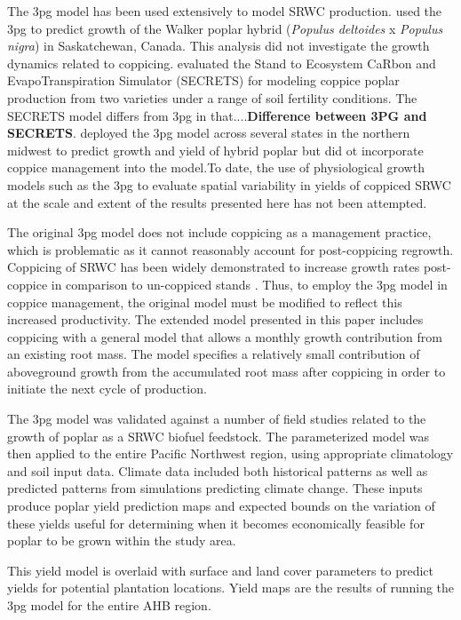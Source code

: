\documentclass[preprint,12pt]{elsarticle}
\begin{document}
The \ac{3pg} model has been used extensively to model \ac{SRWC}
production. \citet{Amichev2010} used the \ac{3pg} to predict growth of
the Walker poplar hybrid (\textit{Populus deltoides} x \textit{Populus
  nigra}) in Saskatchewan, Canada. This analysis did not investigate
the growth dynamics related to coppicing. \citet{Deckmyn2004}
evaluated the Stand to Ecosystem CaRbon and EvapoTranspiration
Simulator (SECRETS) for modeling coppice poplar production from two
varieties under a range of soil fertility conditions. The SECRETS
model differs from \ac{3pg} in that....\textbf{Difference between 3PG
  and SECRETS}. \citet{Headlee2012} deployed the \ac{3pg} model across
several states in the northern midwest to predict growth and yield of
hybrid poplar but did ot incorporate coppice management into the model.To date, the use of
physiological growth models such as the \ac{3pg} to evaluate spatial
variability in yields of coppiced \ac{SRWC} at the scale and extent of
the results presented here has not been attempted. 


The original \ac{3pg} model does not include coppicing as a management
practice, which is problematic as it cannot reasonably account for
post-coppicing regrowth.  Coppicing of \ac{SRWC} has been widely
demonstrated to increase growth rates post-coppice in comparison to
un-coppiced stands
\cite{Verwijst1996,Afas2008a,Sennerby-Forsse1992}. Thus, to employ the
\ac{3pg} model in coppice management, the
original model must be modified to reflect this increased
productivity. The extended model presented in this paper includes coppicing with a
general model that allows a monthly growth contribution from an
existing root mass.  The model specifies a relatively small
contribution of aboveground growth from the accumulated root mass
after coppicing in order to initiate the next cycle of production.

The \ac{3pg} model was validated against a number of field studies
related to the growth of poplar as a \ac{SRWC} biofuel feedstock\cite{Pontailler1999,Proe1999,Afas2008a}.  The
parameterized model was then applied to the entire Pacific Northwest
region, using appropriate climatology and soil input data.  Climate
data included both historical patterns as well as predicted patterns
from simulations predicting climate change.  These inputs produce
poplar yield prediction maps and expected bounds on the variation of
these yields useful for determining when it becomes economically
feasible for poplar to be grown within the study area. 

This yield model is overlaid with surface and land cover
parameters to predict yields for potential plantation locations.
Yield maps are the results of running the \ac{3pg} model for the
entire \ac{AHB} region. 
\end{document}
